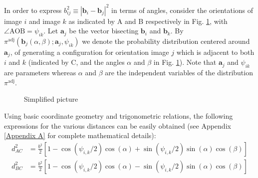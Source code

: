 In order to express $b^2_{ij} \equiv |{\mathbf b}_i - {\mathbf b}_{j}|^2$ in terms of angles, consider the orientations of image $i$ and image $k$ as indicated by A and B respectively in Fig. \ref{fig:simple}, with $\angle \text{AOB} = \psi_{ik}$. Let ${\mathbf a}_j$ be the vector bisecting ${\mathbf b}_i$ and  ${\mathbf b}_k$. By $\pi^\text{adj} \left( {\mathbf b}_j (\alpha, \beta); \mathbf{a}_j, \psi_{ik} \right)$ we denote the probability distribution centered around ${\mathbf a}_j$, of generating a configuration for orientation image $j$ which is adjacent to both $i$ and $k$ (indicated by C, and the angles $\alpha$ and $\beta$ in Fig. \ref{fig:simple}). Note that $\mathbf{a}_j$ and $\psi_{ik}$ are parameters whereas $\alpha$ and $\beta$ are the independent variables of the distribution $\pi^\text{adj}$.
            \begin{figure}[!htbp]
                \centering
                \def\svgwidth{0.25\columnwidth}
                
                \caption{Simplified picture}
                \label{fig:simple}
            \end{figure}
            Using basic coordinate geometry and trigonometric relations, the following expressions for the various distances can be easily obtained (see Appendix \ref{Appendix A} for complete mathematical details):
            \begin{equation}
            \label{eq:deltax}
                \begin{aligned}
                    d_{AC}^2 &= \frac{b^2}{2} [1 - \cos(\psi_{i,k}/2) \cos(\alpha) + \sin(\psi_{i,k}/2) \sin(\alpha) \cos(\beta)]\\
                    d_{BC}^2 &= \frac{b^2}{2} [1 - \cos(\psi_{i,k}/2) \cos(\alpha) - \sin(\psi_{i,k}/2) \sin(\alpha) \cos(\beta)]
                \end{aligned}
            \end{equation}

